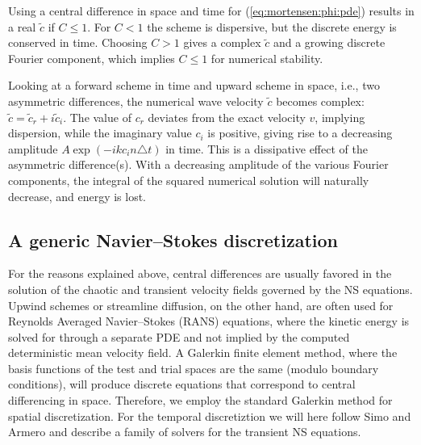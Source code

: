 Using a central difference in space and time for (\eqref{eq:mortensen:phi:pde})
results in a real $\tilde c$ if $C\leq 1$.
For $C<1$ the scheme is dispersive, but
the discrete energy  is conserved in time.
Choosing $C>1$ gives a complex $\tilde c$ and a growing discrete Fourier
component, which implies $C\leq1$ for numerical stability.

Looking at a forward scheme in time and upward scheme in space, i.e.,
two asymmetric differences, the numerical wave velocity $\tilde c$ becomes
complex: $\tilde c = \tilde c_r + i\tilde c_i$. 
The value of $c_r$ deviates from the exact velocity $v$, implying
dispersion, while the imaginary value $c_i$ is positive, giving rise
to a decreasing amplitude $A\exp{(-ikc_i n\triangle t)}$ in time.
This is a dissipative effect of the asymmetric difference(s). 
With a decreasing amplitude of the various
Fourier components, the integral of the squared numerical solution will
naturally decrease, and energy is lost.


\subsection{A generic Navier--Stokes discretization}
\label{sec:mortensen:NS-solver}

For the reasons explained above, central differences are
usually favored in the solution of the chaotic and transient velocity
fields governed by the NS equations. Upwind schemes or streamline
diffusion, on the other hand, are often used for Reynolds Averaged
Navier--Stokes (RANS) equations, where the kinetic energy is solved for
through a separate PDE and not implied by the computed deterministic
mean velocity field. A Galerkin finite element method, where the basis functions
of the test and trial spaces are the same (modulo boundary conditions),
will produce discrete equations that correspond to central differencing 
in space. Therefore, we employ the standard Galerkin method for spatial
discretization. For the temporal
discretiztion we will here follow Simo and Armero \cite{SimoArmero1994} and describe a family of solvers for the transient NS equations.

